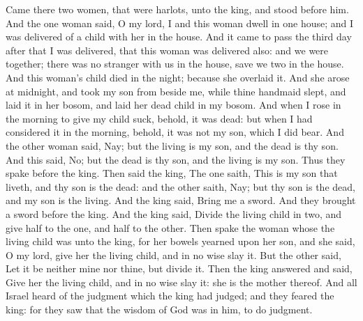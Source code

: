  Came there two women, that were harlots, unto the king, and stood before him. And the one woman said, O my lord, I and this woman dwell in one house; and I was delivered of a child with her in the house. And it came to pass the third day after that I was delivered, that this woman was delivered also: and we were together; there was no stranger with us in the house, save we two in the house. And this woman's child died in the night; because she overlaid it. And she arose at midnight, and took my son from beside me, while thine handmaid slept, and laid it in her bosom, and laid her dead child in my bosom. And when I rose in the morning to give my child suck, behold, it was dead: but when I had considered it in the morning, behold, it was not my son, which I did bear. And the other woman said, Nay; but the living is my son, and the dead is thy son. And this said, No; but the dead is thy son, and the living is my son. Thus they spake before the king. Then said the king, The one saith, This is my son that liveth, and thy son is the dead: and the other saith, Nay; but thy son is the dead, and my son is the living. And the king said, Bring me a sword. And they brought a sword before the king. And the king said, Divide the living child in two, and give half to the one, and half to the other. Then spake the woman whose the living child was unto the king, for her bowels yearned upon her son, and she said, O my lord, give her the living child, and in no wise slay it. But the other said, Let it be neither mine nor thine, but divide it. Then the king answered and said, Give her the living child, and in no wise slay it: she is the mother thereof. And all Israel heard of the judgment which the king had judged; and they feared the king: for they saw that the wisdom of God was in him, to do judgment.


